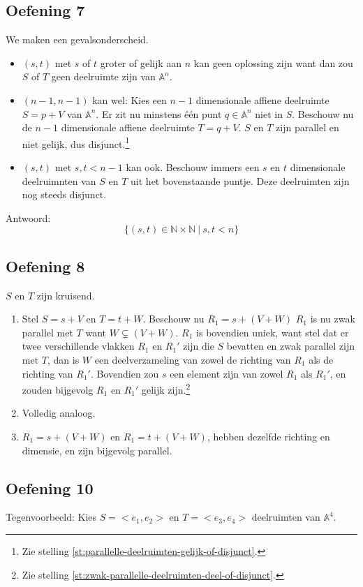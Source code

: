 \documentclass[main.tex]{subfiles}
\begin{document}
\subsection*{Oefening 7}
We maken een gevalsonderscheid.
\begin{itemize}
\item $(s,t)$ met $s$ of $t$ groter of gelijk aan $n$ kan geen oplossing zijn want dan zou $S$ of $T$ geen deelruimte zijn van $\mathbb{A}^{n}$.
\item $(n-1,n-1)$ kan wel:
  Kies een $n-1$ dimensionale affiene deelruimte $S = p + V$ van $\mathbb{A}^{n}$.
  Er zit nu minstens \'e\'en punt $q\in \mathbb{A}^{n}$ niet in $S$.
  Beschouw nu de $n-1$ dimensionale affiene deelruimte $T = q + V$.
  $S$ en $T$ zijn parallel en niet gelijk, dus disjunct.\footnote{Zie stelling \ref{st:parallelle-deelruimten-gelijk-of-disjunct}.}
\item $(s,t)$ met $s,t < n-1$ kan ook.
  Beschouw immers een $s$ en $t$ dimensionale deelruimnten van $S$ en $T$ uit het bovenstaande puntje.
  Deze deelruimten zijn nog steeds disjunct.
\end{itemize}
Antwoord:
\[ \{(s,t)\in \mathbb{N}\times\mathbb{N}\ |\ s,t<n\}\]

\subsection*{Oefening 8}
$S$ en $T$ zijn kruisend.
\begin{enumerate}
\item Stel $S = s+V$ en $T = t+W$.
  Beschouw nu $R_{1} = s + (V+W)$
  $R_{1}$ is nu zwak parallel met $T$ want $W \subsetneq (V+W)$.
  $R_{1}$ is bovendien uniek, want stel dat er twee verschillende vlakken $R_{1}$ en $R_{1}'$ zijn die $S$ bevatten en zwak parallel zijn met $T$, dan is $W$ een deelverzameling van zowel de richting van $R_{1}$ als de richting van $R_{1}'$. Bovendien zou $s$ een element zijn van zowel $R_{1}$ als $R_{1}'$, en zouden bijgevolg $R_{1}$ en $R_{1}'$ gelijk zijn.\footnote{Zie stelling \ref{st:zwak-parallelle-deelruimten-deel-of-disjunct}.}
\item Volledig analoog.
\item $R_{1} = s + (V+W)$ en $R_{1} = t + (V+W)$, hebben dezelfde richting en dimensie, en zijn bijgevolg parallel.
\end{enumerate}

 
\subsection*{Oefening 10}
Tegenvoorbeeld:
Kies $S = <e_{1},e_{2}>$ en $T = <e_{3},e_{4}>$ deelruimten van $\mathbb{A}^{4}$.
\end{document}
